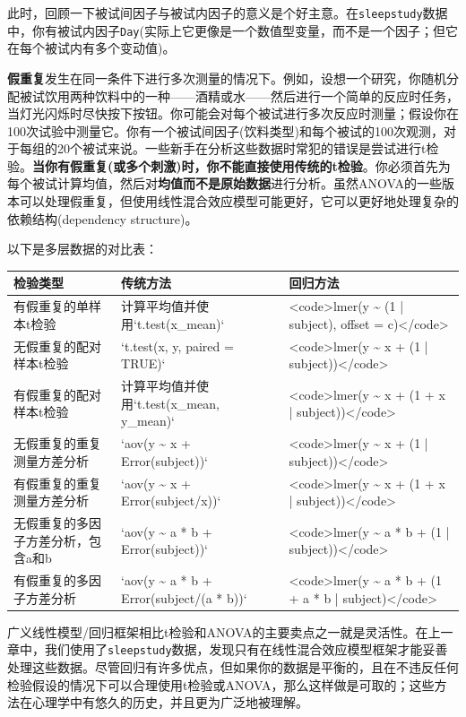 \documentclass[
]{book}
\begin{document}
此时，回顾一下被试间因子与被试内因子的意义是个好主意。在\texttt{sleepstudy}数据中，你有被试内因子\texttt{Day}(实际上它更像是一个数值型变量，而不是一个因子；但它在每个被试内有多个变动值)。

\textbf{假重复}发生在同一条件下进行多次测量的情况下。例如，设想一个研究，你随机分配被试饮用两种饮料中的一种------酒精或水------然后进行一个简单的反应时任务，当灯光闪烁时尽快按下按钮。你可能会对每个被试进行多次反应时测量；假设你在100次试验中测量它。你有一个被试间因子(饮料类型)和每个被试的100次观测，对于每组的20个被试来说。一些新手在分析这些数据时常犯的错误是尝试进行t检验。\textbf{当你有假重复(或多个刺激)时，你不能直接使用传统的t检验}。你必须首先为每个被试计算均值，然后对\textbf{均值而不是原始数据}进行分析。虽然ANOVA的一些版本可以处理假重复，但使用线性混合效应模型可能更好，它可以更好地处理复杂的依赖结构(dependency structure)。

以下是多层数据的对比表：

\begin{tabular}{l|l|l}
\hline
检验类型 & 传统方法 & 回归方法\\
\hline
有假重复的单样本t检验 & 计算平均值并使用`t.test(x\_mean)` & <code>lmer(y \textasciitilde{} (1 | subject), offset = c)</code>\\
\hline
无假重复的配对样本t检验 & `t.test(x, y, paired = TRUE)` & <code>lmer(y \textasciitilde{} x + (1 | subject))</code>\\
\hline
有假重复的配对样本t检验 & 计算平均值并使用`t.test(x\_mean, y\_mean)` & <code>lmer(y \textasciitilde{} x + (1 + x | subject))</code>\\
\hline
无假重复的重复测量方差分析 & `aov(y \textasciitilde{} x + Error(subject))` & <code>lmer(y \textasciitilde{} x + (1 | subject))</code>\\
\hline
有假重复的重复测量方差分析 & `aov(y \textasciitilde{} x + Error(subject/x))` & <code>lmer(y \textasciitilde{} x + (1 + x | subject))</code>\\
\hline
无假重复的多因子方差分析，包含a和b & `aov(y \textasciitilde{} a * b + Error(subject))` & <code>lmer(y \textasciitilde{} a * b + (1 | subject))</code>\\
\hline
有假重复的多因子方差分析 & `aov(y \textasciitilde{} a * b + Error(subject/(a * b))` & <code>lmer(y \textasciitilde{} a * b + (1 + a * b | subject)</code>\\
\hline
\end{tabular}

广义线性模型/回归框架相比t检验和ANOVA的主要卖点之一就是灵活性。在上一章中，我们使用了\texttt{sleepstudy}数据，发现只有在线性混合效应模型框架才能妥善处理这些数据。尽管回归有许多优点，但如果你的数据是平衡的，且在不违反任何检验假设的情况下可以合理使用t检验或ANOVA，那么这样做是可取的；这些方法在心理学中有悠久的历史，并且更为广泛地被理解。
\end{document}
